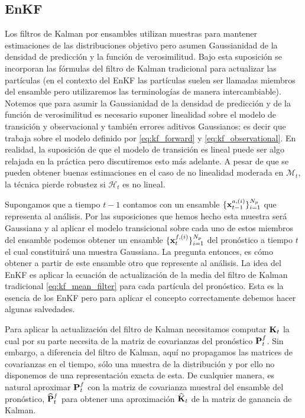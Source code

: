 \subsection{EnKF} \label{sec:enkf}
Los filtros de Kalman por ensambles utilizan muestras para mantener estimaciones de las distribuciones objetivo pero asumen Gaussianidad de la densidad de predicción y la función  de verosimilitud. Bajo esta suposición se incorporan las fórmulas del filtro de Kalman tradicional para actualizar las partículas (en el contexto del EnKF las partículas suelen ser llamadas miembros del ensamble pero utilizaremos las terminologías de manera intercambiable). Notemos que para asumir la Gaussianidad de la densidad de predicción y de la función de verosimilitud es necesario suponer linealidad sobre el modelo de transición y observacional y también errores aditivos Gaussianos: es decir que trabaja sobre el modelo definido por \ref{eq:kf_forward} y \ref{eq:kf_observational}. En realidad, la suposición de que el modelo de transición es lineal puede ser algo relajada en la práctica pero discutiremos esto más adelante. A pesar de que se pueden obtener buenas estimaciones en el caso de no linealidad moderada en $\mathcal{M}_t$, la técnica pierde robustez si $\mathcal{H}_t$ es no lineal. 

Supongamos que a tiempo $t-1$ contamos con un ensamble $\{ \mathbf{x}_{t-1}^{a, (i)} \}_{i=1}^{N_p}$ que representa al análisis. Por las suposiciones que hemos hecho esta muestra será Gaussiana y al aplicar el modelo transicional sobre cada uno de estos miembros del ensamble podemos obtener un ensamble $\{ \mathbf{x}_{t}^{f, (i)} \}_{i=1}^{N_p}$ del pronóstico a tiempo $t$ el cual constituirá una muestra Gaussiana. La pregunta entonces, es cómo obtener a partir de este ensamble otro que represente al análisis. La idea del EnKF es aplicar la ecuación de actualización de la media del filtro de Kalman tradicional \ref{eq:kf_mean_filter} para cada partícula del pronóstico. Esta es la esencia de los EnKF pero para aplicar el concepto correctamente debemos hacer algunas salvedades.

Para aplicar la actualización del filtro de Kalman necesitamos computar $\mathbf{K}_t$ la cual por su parte necesita de la matriz de covarianzas del pronóstico $\mathbf{P}_t^f$. Sin embargo, a diferencia del filtro de Kalman, aquí no propagamos las matrices de covarianzas en el tiempo, sólo una muestra de la distribución y por ello no disponemos de una representación exacta de esta. De cualquier manera, es natural aproximar $\mathbf{P}_t^f$ con la matriz de covarianza muestral del ensamble del pronóstico, $\widehat{\mathbf{P}}_t^f$ para obtener una aproximación $\widehat{\mathbf{K}}_t$ de la matriz de ganancia de Kalman.

